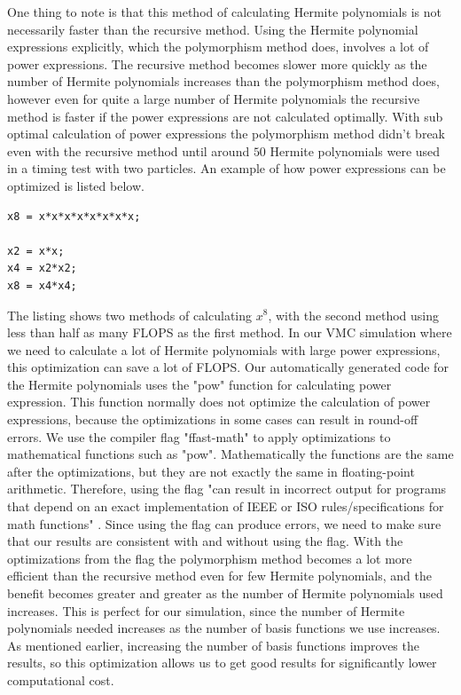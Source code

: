 \documentclass[../main.tex]{subfiles}
\begin{document}
One thing to note is that this method of calculating Hermite polynomials is not necessarily faster than the recursive method. Using the Hermite polynomial expressions explicitly, which the polymorphism method does, involves a lot of power expressions. The recursive method becomes slower more quickly as the number of Hermite polynomials increases than the polymorphism method does, however even for quite a large number of Hermite polynomials the recursive method is faster if the power expressions are not calculated optimally. With sub optimal calculation of power expressions the polymorphism method didn't break even with the recursive method until around $50$ Hermite polynomials were used in a timing test with two particles. An example of how power expressions can be optimized is listed below.
\lstset{language=c++}
\begin{lstlisting}[caption={Two methods for calculating $x^8$. The first method uses $7$ FLOPS, while the second method uses only $3$ FLOPS.}]
x8 = x*x*x*x*x*x*x*x;

x2 = x*x;
x4 = x2*x2;
x8 = x4*x4;
\end{lstlisting}
The listing shows two methods of calculating $x^8$, with the second method using less than half as many FLOPS as the first method. In our VMC simulation where we need to calculate a lot of Hermite polynomials with large power expressions, this optimization can save a lot of FLOPS. Our automatically generated code for the Hermite polynomials uses the "pow" function for calculating power expression. This function normally does not optimize the calculation of power expressions, because the optimizations in some cases can result in round-off errors. We use the compiler flag "ffast-math" to apply optimizations to mathematical functions such as "pow". Mathematically the functions are the same after the optimizations, but they are not exactly the same in floating-point arithmetic. Therefore, using the flag "can result in incorrect output for programs that depend on an exact implementation of IEEE or ISO rules/specifications for math functions" \cite{gccDocs}. Since using the flag can produce errors, we need to make sure that our results are consistent with and without using the flag. With the optimizations from the flag the polymorphism method becomes a lot more efficient than the recursive method even for few Hermite polynomials, and the benefit becomes greater and greater as the number of Hermite polynomials used increases. This is perfect for our simulation, since the number of Hermite polynomials needed increases as the number of basis functions we use increases. As mentioned earlier, increasing the number of basis functions improves the results, so this optimization allows us to get good results for significantly lower computational cost.
\end{document}
